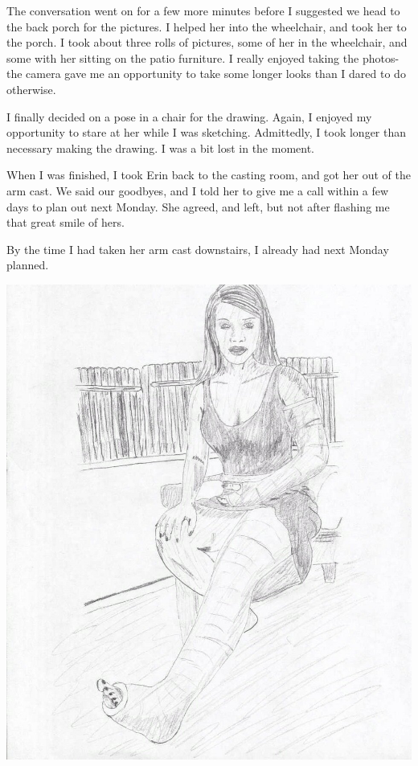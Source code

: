 The conversation went on for a few more minutes before I suggested we head to the back porch
for the pictures. I helped her into the wheelchair, and took her to the porch. I took about
three rolls of pictures, some of her in the wheelchair, and some with her sitting on the patio
furniture. I really enjoyed taking the photos- the camera gave me an opportunity to take some
longer looks than I dared to do otherwise.

I finally decided on a pose in a chair for the drawing. Again, I enjoyed my opportunity to
stare at her while I was sketching. Admittedly, I took longer than necessary making the drawing.
I was a bit lost in the moment.

When I was finished, I took Erin back to the casting room, and got her out of the arm cast.
We said our goodbyes, and I told her to give me a call within a few days to plan out next
Monday. She agreed, and left, but not after flashing me that great smile of hers.

By the time I had taken her arm cast downstairs, I already had next Monday planned.

\newpage
\begin{center}
\includegraphics{images/kicks21.jpg}
\end{center}
